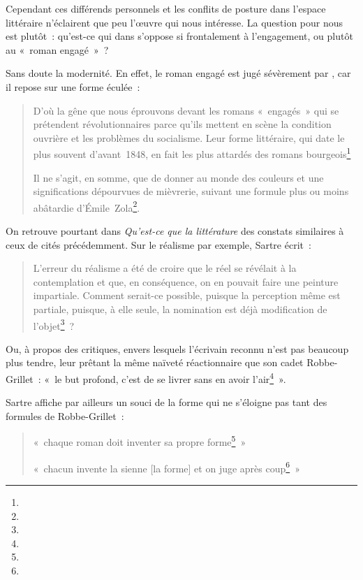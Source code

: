 Cependant ces différends personnels et les conflits de posture dans l'espace littéraire n'éclairent que peu l'œuvre qui nous intéresse. La question pour nous est plutôt~: qu'est-ce qui dans \punr{} s'oppose si frontalement à l'engagement, ou plutôt au «~roman engagé~»~?

Sans doute la modernité. En effet, le roman engagé est jugé sévèrement par \robbe, car il repose sur une forme éculée~: 
\begin{quote}
    D'où la gêne que nous éprouvons devant les romans «~engagés~» qui se prétendent révolutionnaires parce qu'ils mettent en scène la condition ouvrière et les problèmes du socialisme. Leur forme littéraire, qui date le plus souvent d'avant~1848, en fait les plus attardés des romans bourgeois\footnote{}

    Il ne s'agit, en somme, que de donner au monde des couleurs et une significations dépourvues de mièvrerie, suivant une formule plus ou moins abâtardie d'Émile~Zola\footnote{}.
\end{quote}


On retrouve pourtant dans \textit{Qu'est-ce que la littérature} des constats similaires à ceux de \punr{}  cités précédemment. Sur le réalisme par exemple, Sartre écrit~:
    \begin{quote}
        L'erreur du réalisme a été de croire que le réel se révélait à la contemplation et que, en conséquence, on en pouvait faire une peinture impartiale. Comment serait-ce possible, puisque la perception même est partiale, puisque, à elle seule, la nomination est déjà modification de l'objet\footnote{}~?
    \end{quote}
 Ou, à propos des critiques, envers lesquels l'écrivain reconnu n'est pas beaucoup plus tendre, leur prêtant la même naïveté réactionnaire que son cadet Robbe-Grillet~: «~le but profond, c'est de se livrer sans en avoir l'air\footnote{}~».

Sartre affiche par ailleurs un souci de la forme qui ne s'éloigne pas tant des formules de Robbe-Grillet~: 
\begin{quote}
    «~chaque roman doit inventer sa propre forme\footnote{}~» 

    «~chacun invente la sienne [la forme] et on juge après coup\footnote{}~»
\end{quote}

